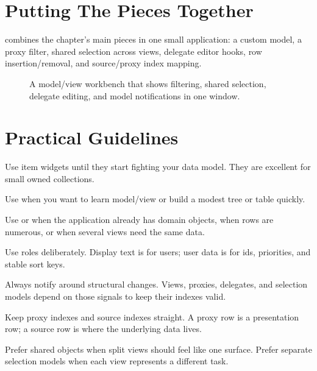 \section{Putting The Pieces Together}

 combines the chapter's main pieces in one small application: a custom model, a proxy filter, shared selection across views, delegate editor hooks, row insertion/removal, and source/proxy index mapping.

\begin{figure}[htbp]
  \centering
  \caption{A model/view workbench that shows filtering, shared selection, delegate editing, and model notifications in one window.}
\end{figure}

\section{Practical Guidelines}

Use item widgets until they start fighting your data model. They are excellent for small owned collections.

Use  when you want to learn model/view or build a modest tree or table quickly.

Use  or  when the application already has domain objects, when rows are numerous, or when several views need the same data.

Use roles deliberately. Display text is for users; user data is for ids, priorities, and stable sort keys.

Always notify around structural changes. Views, proxies, delegates, and selection models depend on those signals to keep their indexes valid.

Keep proxy indexes and source indexes straight. A proxy row is a presentation row; a source row is where the underlying data lives.

Prefer shared  objects when split views should feel like one surface. Prefer separate selection models when each view represents a different task.
